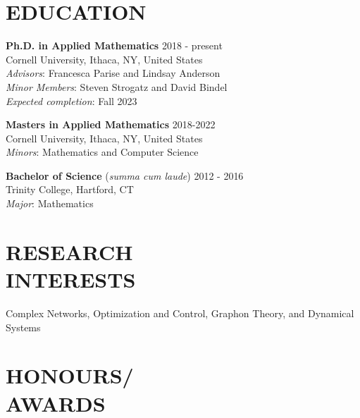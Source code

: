 \documentclass[margin]{res} %
\begin{document}
\begin{resume}

\section{EDUCATION}  
\textbf{Ph.D. in Applied Mathematics} \hfill 2018 - present\\
Cornell University, Ithaca, NY, United States\\
\textit{Advisors}: Francesca Parise and Lindsay Anderson \\
\textit{Minor Members}: Steven Strogatz and David Bindel\\
\textit{Expected completion}: Fall 2023
\smallskip

\textbf{Masters in Applied Mathematics} \hfill 2018-2022\\
Cornell University, Ithaca, NY, United States\\
\textit{Minors}: Mathematics and Computer Science
\smallskip

\textbf{Bachelor of Science} (\textit{summa cum laude}) \hfill 2012 - 2016 \\
Trinity College, Hartford, CT\\
\textit{Major}: Mathematics\\



\section{RESEARCH \\ INTERESTS} 
Complex Networks, Optimization and Control, Graphon Theory, and Dynamical Systems 

\section{HONOURS/\\AWARDS}


\end{resume}
\end{document}
